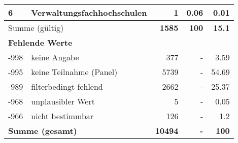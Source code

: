 \begin{longtable}{lXrrr}
     6 &
     \multicolumn{1}{X}{ Verwaltungsfachhochschulen   } &


       \num{1} &
       \num[round-mode=places,round-precision=2]{0,06} &
         \num[round-mode=places,round-precision=2]{0,01} \\
     \midrule
     \multicolumn{2}{l}{Summe (gültig)} &
       \textbf{\num{1585}} &
     \textbf{100} &
       \textbf{\num[round-mode=places,round-precision=2]{15,1}} \\
     \multicolumn{5}{l}{\textbf{Fehlende Werte}}\\
       -998 &
       keine Angabe &
         \num{377} &
        - &
         \num[round-mode=places,round-precision=2]{3,59} \\
       -995 &
       keine Teilnahme (Panel) &
         \num{5739} &
        - &
         \num[round-mode=places,round-precision=2]{54,69} \\
       -989 &
       filterbedingt fehlend &
         \num{2662} &
        - &
         \num[round-mode=places,round-precision=2]{25,37} \\
       -968 &
       unplausibler Wert &
         \num{5} &
        - &
         \num[round-mode=places,round-precision=2]{0,05} \\
       -966 &
       nicht bestimmbar &
         \num{126} &
        - &
         \num[round-mode=places,round-precision=2]{1,2} \\
     \midrule
     \multicolumn{2}{l}{\textbf{Summe (gesamt)}} &
          \textbf{\num{10494}} &
        \textbf{-} &
        \textbf{100} \\
     \bottomrule
     \end{longtable}
     
